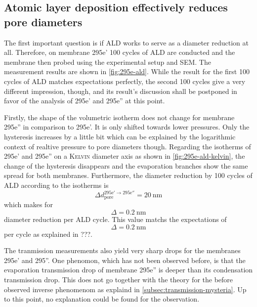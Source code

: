 \documentclass[../thesis.tex]{subfiles}
\begin{document}
        


        \subsection{Atomic layer deposition effectively reduces pore diameters}
        \label{subsec:ald-reduces-diameters}

          The first important question is if ALD works to serve as a diameter reduction at all. Therefore, on membrane 295e' 100 cycles of ALD are conducted and the membrane then probed using the experimental setup and SEM. The measurement results are shown in \cref{fig:295e-ald}. While the result for the first 100 cycles of ALD matches expectations perfectly, the second 100 cycles give a very different impression, though, and its result's discussion shall be postponed in favor of the analysis of 295e' and 295e'' at this point.

          Firstly, the shape of the volumetric isotherm does not change for membrane 295e'' in comparison to 295e'. It is only shifted towards lower pressures. Only the hysteresis increases by a little bit which can be explained by the logarithmic context of realtive pressure to pore diameters though. Regarding the isotherms of 295e' and 295e'' on a \textsc{Kelvin} diameter axis as shown in \cref{fig:295e-ald-kelvin}, the change of the hysteresis disappears and the evaporation branches show the same spread for both membranes. Furthermore, the diameter reduction by 100 cycles of ALD according to the isotherms is
          \begin{equation}
            \Delta d_\mathrm{pore}^\mathrm{295e'\rightarrow 295e''}=\SI{20}{\nano\meter}
          \end{equation}
          which makes for
          \begin{equation}
            \Delta =\SI{0,2}{\nano\meter}
          \end{equation}
          diameter reduction per ALD cycle. This value matchs the expectations of
          \begin{equation}
            \Delta = \SI{0,2}{\nano\meter}
          \end{equation}
          per cycle as explained in ???.

          The tranmission measurements also yield very sharp drops for the membranes 295e' and 295''. One phenomon, which has not been observed before, is that the evaporation transmission drop of membrane 295e'' is deeper than its condensation transmission drop. This does not go together with the theory for the before observed inverse phenomenom as explaind in \cref{subsec:transmission-mysteria}. Up to this point, no explanation could be found for the observation.
\end{document}
